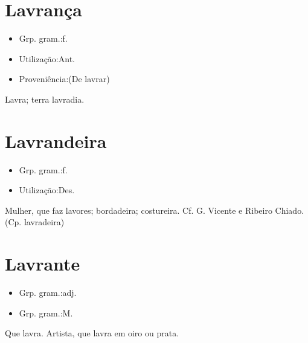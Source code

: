 \section{Lavrança}
\begin{itemize}
\item {Grp. gram.:f.}
\end{itemize}
\begin{itemize}
\item {Utilização:Ant.}
\end{itemize}
\begin{itemize}
\item {Proveniência:(De \textunderscore lavrar\textunderscore )}
\end{itemize}
Lavra; terra lavradia.
\section{Lavrandeira}
\begin{itemize}
\item {Grp. gram.:f.}
\end{itemize}
\begin{itemize}
\item {Utilização:Des.}
\end{itemize}
Mulher, que faz lavores; bordadeira; costureira. Cf. G. Vicente e Ribeiro Chiado.
(Cp. \textunderscore lavradeira\textunderscore )
\section{Lavrante}
\begin{itemize}
\item {Grp. gram.:adj.}
\end{itemize}
\begin{itemize}
\item {Grp. gram.:M.}
\end{itemize}
Que lavra.
Artista, que lavra em oiro ou prata.

